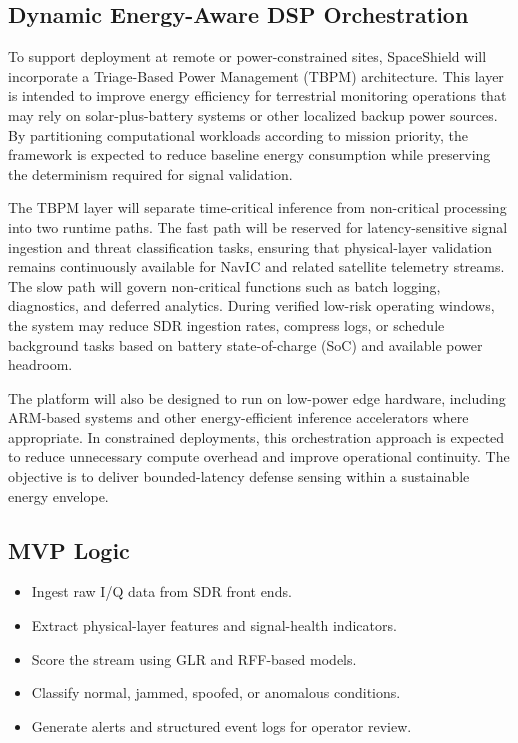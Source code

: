 \documentclass[11pt,a4paper]{article}
\begin{document}
\subsection{Dynamic Energy-Aware DSP Orchestration}

To support deployment at remote or power-constrained sites, SpaceShield will incorporate a Triage-Based Power Management (TBPM) architecture. This layer is intended to improve energy efficiency for terrestrial monitoring operations that may rely on solar-plus-battery systems or other localized backup power sources. By partitioning computational workloads according to mission priority, the framework is expected to reduce baseline energy consumption while preserving the determinism required for signal validation.

The TBPM layer will separate time-critical inference from non-critical processing into two runtime paths. The fast path will be reserved for latency-sensitive signal ingestion and threat classification tasks, ensuring that physical-layer validation remains continuously available for NavIC and related satellite telemetry streams. The slow path will govern non-critical functions such as batch logging, diagnostics, and deferred analytics. During verified low-risk operating windows, the system may reduce SDR ingestion rates, compress logs, or schedule background tasks based on battery state-of-charge (SoC) and available power headroom.

The platform will also be designed to run on low-power edge hardware, including ARM-based systems and other energy-efficient inference accelerators where appropriate. In constrained deployments, this orchestration approach is expected to reduce unnecessary compute overhead and improve operational continuity. The objective is to deliver bounded-latency defense sensing within a sustainable energy envelope.

\subsection{MVP Logic}

\begin{itemize}
    \item Ingest raw I/Q data from SDR front ends.
    \item Extract physical-layer features and signal-health indicators.
    \item Score the stream using GLR and RFF-based models.
    \item Classify normal, jammed, spoofed, or anomalous conditions.
    \item Generate alerts and structured event logs for operator review.
\end{itemize}
\end{document}

